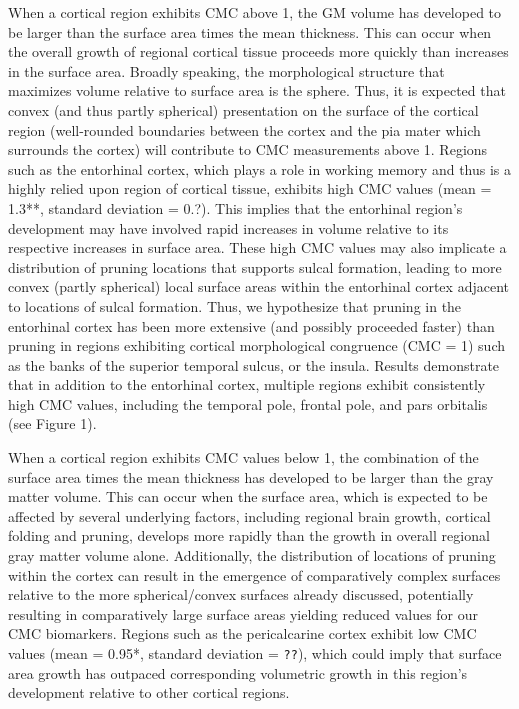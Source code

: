 \documentclass{article}
\begin{document}
When a cortical region exhibits CMC above 1, the GM volume has developed to
be larger than the surface area times the mean thickness. This can occur when
the overall growth of regional cortical tissue proceeds more quickly than
increases in the surface area. Broadly speaking, the morphological structure
that maximizes volume relative to surface area is the sphere. Thus, it is
expected that convex (and thus partly spherical) presentation on the surface
of the cortical region (well-rounded boundaries between the cortex and the
pia mater which surrounds the cortex) will contribute to CMC measurements
above 1. Regions such as the entorhinal cortex, which plays a role in working
memory and thus is a highly relied upon region of cortical tissue, exhibits
high CMC values (mean = 1.3**, standard deviation = 0.?). This implies that
the entorhinal region's development may have involved rapid increases in
volume relative to its respective increases in surface area. These high CMC
values may also implicate a distribution of pruning locations that supports
sulcal formation, leading to more convex (partly spherical) local surface
areas within the entorhinal cortex adjacent to locations of sulcal formation.
Thus, we hypothesize that pruning in the entorhinal cortex has been more
extensive (and possibly proceeded faster) than pruning in regions exhibiting
cortical morphological congruence (CMC = 1) such as the banks of the superior
temporal sulcus, or the insula. Results demonstrate that in addition to the
entorhinal cortex, multiple regions exhibit consistently high CMC values,
including the temporal pole, frontal pole, and pars orbitalis (see Figure 1).

When a cortical region exhibits CMC values below 1, the combination of the
surface area times the mean thickness has developed to be larger than the
gray matter volume. This can occur when the surface area, which is expected
to be affected by several underlying factors, including regional brain
growth, cortical folding and pruning, develops more rapidly than the growth
in overall regional gray matter volume alone. Additionally, the distribution
of locations of pruning within the cortex can result in the emergence of
comparatively complex surfaces relative to the more spherical/convex surfaces
already discussed, potentially resulting in comparatively large surface areas
yielding reduced values for our CMC biomarkers. Regions such as the
pericalcarine cortex exhibit low CMC values (mean = 0.95*, standard deviation
= \verb|??|), which could imply that surface area growth has outpaced corresponding
volumetric growth in this region's development relative to other cortical
regions.
\end{document}
